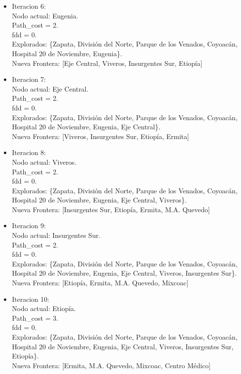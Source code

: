 \documentclass[10pt,a4paper]{article}
\begin{document}
\begin{itemize}
    \item Iteracion 6:\\
    Nodo actual: Eugenia.\\
    Path\_cost = 2.\\
    fdd = 0.\\
    Explorados: \{Zapata, División del Norte, Parque de los Venados, Coyoacán, Hospital 20 de Noviembre, Eugenia\}.\\
    Nueva Frontera: [Eje Central, Viveros, Insurgentes Sur, Etiopía]

    \item Iteracion 7:\\
    Nodo actual: Eje Central.\\
    Path\_cost = 2.\\
    fdd = 0.\\
    Explorados: \{Zapata, División del Norte, Parque de los Venados, Coyoacán, Hospital 20 de Noviembre, Eugenia, Eje Central\}.\\
    Nueva Frontera: [Viveros, Insurgentes Sur, Etiopía, Ermita]

    \item Iteracion 8:\\
    Nodo actual: Viveros.\\
    Path\_cost = 2.\\
    fdd = 0.\\
    Explorados: \{Zapata, División del Norte, Parque de los Venados, Coyoacán, Hospital 20 de Noviembre, Eugenia, Eje Central, Viveros\}.\\
    Nueva Frontera: [Insurgentes Sur, Etiopía, Ermita, M.A. Quevedo]

    \item Iteracion 9:\\
    Nodo actual: Insurgentes Sur.\\
    Path\_cost = 2.\\
    fdd = 0.\\
    Explorados: \{Zapata, División del Norte, Parque de los Venados, Coyoacán, Hospital 20 de Noviembre, Eugenia, Eje Central, Viveros, Insurgentes Sur\}.\\
    Nueva Frontera: [Etiopía, Ermita, M.A. Quevedo, Mixcoac]

    \item Iteracion 10:\\
    Nodo actual: Etiopía.\\
    Path\_cost = 3.\\
    fdd = 0.\\
    Explorados: \{Zapata, División del Norte, Parque de los Venados, Coyoacán, Hospital 20 de Noviembre, Eugenia, Eje Central, Viveros, Insurgentes Sur, Etiopía\}.\\
    Nueva Frontera: [Ermita, M.A. Quevedo, Mixcoac, Centro Médico]


\end{itemize}
\end{document}
